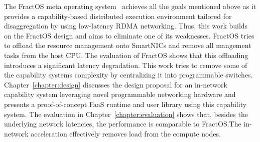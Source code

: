 The FractOS meta operating system~\cite{vilanovaSlashingDisaggregationTax2022} achieves all the goals mentioned above as it provides a capability-based distributed execution environment tailored for disaggregation by using low-latency \ac{RDMA} networking. Thus, this work builds on the FractOS design and aims to eliminate one of its weaknesses.
FractOS tries to offload the resource management onto SmartNICs and remove all mangement tasks from the host \ac{CPU}. The evaluation of FractOS shows that this offloading introduces a significant latency degradation. This work tries to remove some of the capability systems complexity by centralizing it into programmable switches.
Chapter~\ref{chapter:design} discusses the design proposal for an in-network capability system leveraging novel programmable networking hardware and presents a proof-of-concept \ac{FaaS} runtime and user library using this capability system. The evaluation in Chapter~\ref{chapter:evaluation} shows that, besides the underlying network latencies, the performance is comparable to FractOS.\@ The in-network acceleration effectively removes load from the compute nodes.
%
%
%
%

